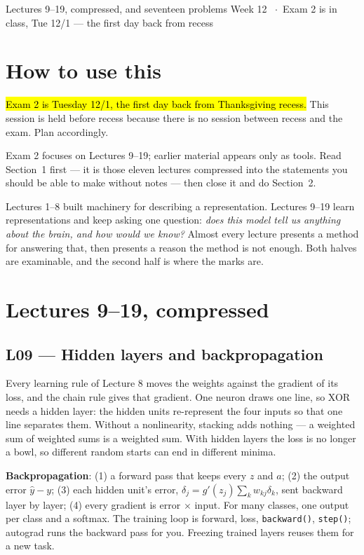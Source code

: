 \documentclass[11pt]{article}
\begin{document}
  {Lectures 9--19, compressed, and seventeen problems}
  {Week 12 \ $\cdot$\ Exam 2 is in class, Tue 12/1 --- the first day back from recess}

\section*{How to use this}

\hl{Exam 2 is Tuesday 12/1, the first day back from Thanksgiving recess.}
This session is held before recess because there is no session between recess and
the exam. Plan accordingly.

Exam 2 focuses on Lectures 9--19; earlier material appears only as tools. Read
Section~1 first --- it is those eleven lectures compressed into the statements
you should be able to make without notes --- then close it and do Section~2.

\begin{keybox}
 Lectures 1--8 built machinery
for describing a representation. Lectures 9--19 learn representations and keep
asking one question: \emph{does this model tell us anything about the brain, and
how would we know?} Almost every lecture presents a method for answering that,
then presents a reason the method is not enough. Both halves are examinable, and
the second half is where the marks are.
\end{keybox}

\section{Lectures 9--19, compressed}

\subsection{L09 --- Hidden layers and backpropagation}

Every learning rule of Lecture 8 moves the weights against the gradient of its
loss, and the chain rule gives that gradient. One neuron draws one line, so XOR
needs a hidden layer: the hidden units re-represent the four inputs so that one
line separates them. Without a nonlinearity, stacking adds nothing --- a
weighted sum of weighted sums is a weighted sum. With hidden layers the loss is
no longer a bowl, so different random starts can end in different minima.

\textbf{Backpropagation}: (1) a forward pass that keeps every $z$ and $a$;
(2) the output error $\hat y-y$; (3) each hidden unit's error,
$\delta_j=g'(z_j)\sum_k w_{kj}\delta_k$, sent backward layer by layer; (4) every
gradient is error $\times$ input. For many classes, one output per class and a
softmax. The training loop is forward, loss, \texttt{backward()},
\texttt{step()}; autograd runs the backward pass for you. Freezing trained layers
reuses them for a new task.
\end{document}
